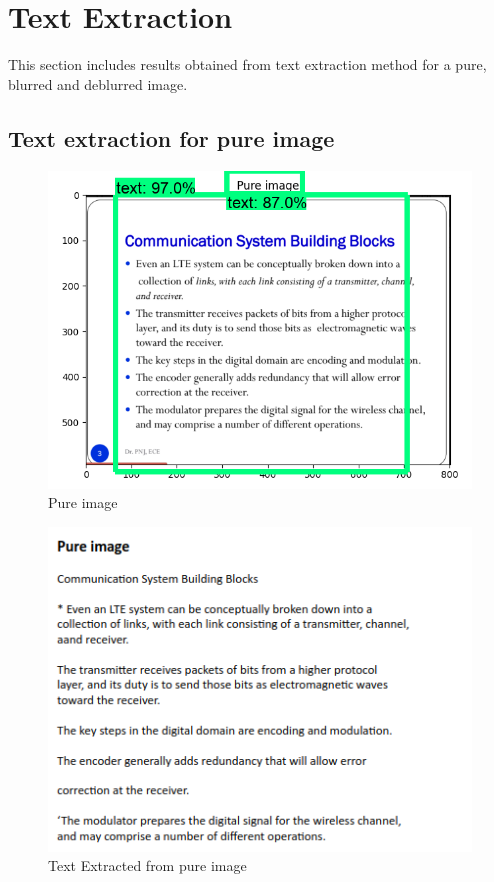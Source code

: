 \section{Text Extraction}
This section includes results obtained from text extraction method for a pure, blurred and deblurred image.
\subsection{Text extraction for pure image}
\begin{figure}[H]
\centering
	\includegraphics[scale=0.7]{Figures/myplot_pure.png}	
	\caption{Pure image}
	\label{fig:pure}
\end{figure}
\begin{figure}[H]
\centering
	\includegraphics[scale=0.7]{Figures/pure_op.png}	
	\caption{Text Extracted from pure image}
	\label{fig:pure_op}
\end{figure}

